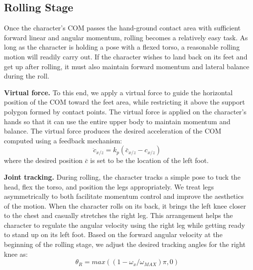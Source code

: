\subsection{Rolling Stage}
\label{sec:landing_rolling}
Once the character's COM passes the hand-ground contact area with
sufficient forward linear and angular momentum, rolling becomes a
relatively easy task. As long as the character is holding a pose with
a flexed torso, a reasonable rolling motion will readily carry out. If
the character wishes to land back on its feet and get up after
rolling, it must also maintain forward momentum and lateral balance
during the roll.

\textbf{Virtual force.} To this end, we apply a virtual force to guide
the horizontal position of the COM toward the feet area, while
restricting it above the support polygon formed by contact points. The
virtual force is applied on the character's hands so that it can use
the entire upper body to maintain momentum and
balance. The virtual force produces the desired acceleration of the COM 
computed using a feedback mechanism:
\begin{equation}
\label{eqn:landing_controlRoll}
\ddot{c}_{x/z} = k_p (\bar{c}_{x/z} - c_{x/z})
\end{equation}
where the desired position $\bar{c}$ is set to be the location of the
left foot.

\textbf{Joint tracking.} During rolling, the character tracks a simple
pose to tuck the head, flex the torso, and position the legs
appropriately. We treat legs asymmetrically to both facilitate
momentum control and improve the aesthetics of the motion. When the
character rolls on its back, it brings the left knee closer to the
chest and casually stretches the right leg. This arrangement helps the
character to regulate the angular velocity using the right leg while
getting ready to stand up on its left foot. Based on the forward
angular velocity at the beginning of the rolling stage, we adjust the
desired tracking angles for the right knee as:
\begin{equation}
\label{eqn:landing_controlLeg}
\theta_R = max( (1 - \omega_x / \omega_{MAX}) \pi, 0 )
\end{equation}
